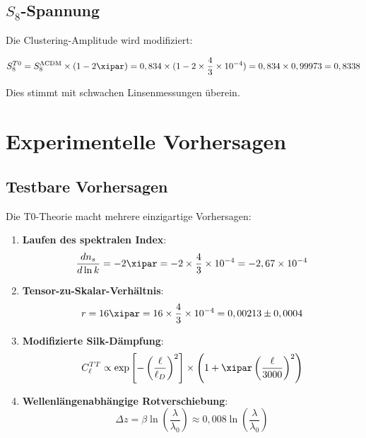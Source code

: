 	\subsection{$S_8$-Spannung}
	
	Die Clustering-Amplitude wird modifiziert:
	
	\begin{equation}
		S_8^{T0} = S_8^{\Lambda\text{CDM}} \times (1 - 2\xipar) = 0,834 \times (1 - 2 \times \frac{4}{3} \times 10^{-4}) = 0,834 \times 0,99973 = 0,8338
	\end{equation}
	
	Dies stimmt mit schwachen Linsenmessungen überein.
	
	\section{Experimentelle Vorhersagen}
	\label{sec:predictions}
	
	\subsection{Testbare Vorhersagen}
	
	Die T0-Theorie macht mehrere einzigartige Vorhersagen:
	
	\begin{enumerate}
		\item \textbf{Laufen des spektralen Index}:
		\begin{equation}
			\frac{dn_s}{d\ln k} = -2\xipar = -2 \times \frac{4}{3} \times 10^{-4} = -2,67 \times 10^{-4}
		\end{equation}
		
		\item \textbf{Tensor-zu-Skalar-Verhältnis}:
		\begin{equation}
			r = 16\xipar = 16 \times \frac{4}{3} \times 10^{-4} = 0,00213 \pm 0,0004
		\end{equation}
		
		\item \textbf{Modifizierte Silk-Dämpfung}:
		\begin{equation}
			C_\ell^{TT} \propto \exp\left[-\left(\frac{\ell}{\ell_D}\right)^2\right] \times \left(1 + \xipar \left(\frac{\ell}{3000}\right)^2\right)
		\end{equation}
		
		\item \textbf{Wellenlängenabhängige Rotverschiebung}:
		\begin{equation}
			\Delta z = \beta \ln\left(\frac{\lambda}{\lambda_0}\right) \approx 0,008 \ln\left(\frac{\lambda}{\lambda_0}\right)
		\end{equation}
	\end{enumerate}
	
